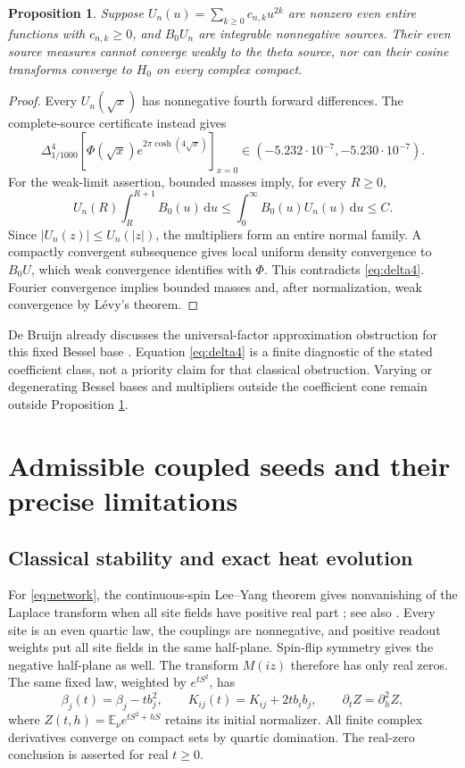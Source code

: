 \documentclass[11pt]{article}
\newtheorem{proposition}[theorem]{Proposition}
\theoremstyle{remark}
\newcommand{\E}{\mathbb E}
\newcommand{\dd}{\,\mathrm d}
\numberwithin{equation}{section}
\begin{document}
\begin{proposition}\label{prop:bessel}
Suppose \(U_n(u)=\sum_{k\ge0}c_{n,k}u^{2k}\) are nonzero even entire
functions with \(c_{n,k}\ge0\), and \(B_0U_n\) are integrable nonnegative
sources. Their even
source measures cannot converge weakly to the theta source, nor can their
cosine transforms converge to \(H_0\) on every complex compact.
\end{proposition}
\begin{proof}
Every \(U_n(\sqrt x)\) has nonnegative fourth forward differences.
The complete-source certificate instead gives
\begin{equation}\label{eq:delta4}
 \Delta_{1/1000}^4
 [\Phi(\sqrt x)e^{2\pi\cosh(4\sqrt x)}]_{x=0}
 \in(-5.232\cdot10^{-7},-5.230\cdot10^{-7}).
\end{equation}
For the weak-limit assertion, bounded masses imply, for every \(R\ge0\),
\[
 U_n(R)\int_R^{R+1}B_0(u)\dd u
 \le\int_0^\infty B_0(u)U_n(u)\dd u\le C.
\]
Since \(|U_n(z)|\le U_n(|z|)\), the multipliers form an entire normal
family. A compactly convergent subsequence gives local uniform density
convergence to \(B_0U\), which weak convergence identifies with \(\Phi\).
This contradicts \eqref{eq:delta4}. Fourier convergence implies bounded
masses and, after normalization, weak convergence by L\'evy's theorem.
\end{proof}

De Bruijn already discusses the universal-factor approximation obstruction
for this fixed Bessel base \cite[p. 221]{debruijn}. Equation
\eqref{eq:delta4} is a finite diagnostic of the stated coefficient class,
not a priority claim for that classical obstruction. Varying or
degenerating Bessel bases and multipliers outside the coefficient cone
remain outside Proposition \ref{prop:bessel}.

\section{Admissible coupled seeds and their precise limitations}
\label{sec:construction}

\subsection{Classical stability and exact heat evolution}
For \eqref{eq:network}, the continuous-spin Lee--Yang theorem gives
nonvanishing of the Laplace transform when all site fields have positive
real part \cite[Theorems 1 and 3]{sg}; see also \cite[Theorem 1]{fr}.
Every site is an even quartic law, the couplings are nonnegative, and
positive readout weights put all site fields in the same half-plane.
Spin-flip symmetry gives the negative half-plane as well.
The transform \(M(iz)\) therefore has only real zeros.
The same fixed law, weighted by \(e^{tS^2}\), has
\begin{equation}\label{eq:continuous-heat}
 \beta_j(t)=\beta_j-tb_j^2,\qquad
 K_{ij}(t)=K_{ij}+2tb_ib_j,\qquad
 \partial_t Z=\partial_h^2 Z,
\end{equation}
where \(Z(t,h)=\E_\nu e^{tS^2+hS}\) retains its initial normalizer.
All finite complex derivatives converge on compact sets by quartic
domination. The real-zero conclusion is asserted for real \(t\ge0\).
\end{document}
